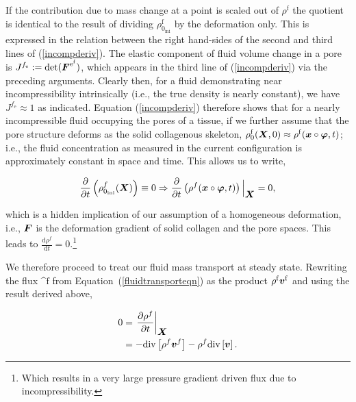 If the contribution due to mass change at a point is scaled out of
$\rho^\mathrm{f}$ the quotient is identical to the result of dividing
$\rho_{0_{\mathrm{ini}}}^{\mathrm{f}}$ by the deformation only. This
is expressed in the relation between the right hand-sides of the
second and third lines of (\ref{incompderiv}). The elastic component
of fluid volume change in a pore is $J^{f_\mathrm{e}} :=
\mathrm{det}(\mbox{\boldmath$ F$}^{\mathrm{e}^{\mathrm{f}}})$, which appears in the
third line of (\ref{incompderiv}) via the preceding arguments. Clearly
then, for a fluid demonstrating near incompressibility intrinsically
(i.e., the true density is nearly constant), we have $J^{f_\mathrm{e}}
\approx 1$ as indicated. Equation (\ref{incompderiv}) therefore shows
that for a nearly incompressible fluid occupying the pores of a
tissue, if we further assume that the pore structure deforms as the
solid collagenous skeleton, $\rho_0^\mathrm{f}(\mbox{\boldmath$ X$},0) \approx
\rho^\mathrm{f}(\mbox{\boldmath$ x$}\circ\mbox{\boldmath$\varphi$},t)$; i.e., the fluid concentration as
measured in the current configuration is approximately constant in
space and time. This allows us to write,

\vspace{-0.5cm} %

\begin{equation}
\frac{\partial} {\partial t}\left(
\rho_{0_{\mathrm{ini}}}^{f}(\mbox{\boldmath$ X$}) \right) \equiv 0 \Rightarrow
\frac{\partial} {\partial t}\left(\rho^{f} (\mbox{\boldmath$ x$}\circ\mbox{\boldmath$\varphi$},t)
\right)\Big\vert_{\mbox{\boldmath$ X$}} = 0,
\end{equation}

\noindent which is a hidden implication of our assumption of a
homogeneous deformation, i.e., $\mbox{\boldmath$ F$}$ is the deformation gradient of
solid collagen and the pore spaces.  This leads to $\frac{\mathrm{d}
  \rho^f} {\mathrm{d} t}=0$.\footnote{Which results in a very large
  pressure gradient driven flux due to incompressibility.}

We therefore proceed to treat our fluid mass transport at steady
state. Rewriting the flux $\bm^{\mathrm{f}}$ from \mbox{Equation
  (\ref{fluidtransporteqn})} as the product $\rho^{\mathrm{f}}
\mbox{\boldmath$ v$}^{\mathrm{f}}$ and using the result derived above,

\vspace{-0.5cm} %

\begin{equation}
\begin{split}
0 &= \left. \frac{\partial \rho^f}{\partial t} \right|_{\mbox{\boldmath$ X$}}\\ &=
-\mathrm{div}\left[\rho^f \mbox{\boldmath$ v$}^{f}\right] - \rho^f
\mathrm{div}\left[\mbox{\boldmath$ v$}\right].
\end{split}
\label{incomprimpl}
\end{equation}

